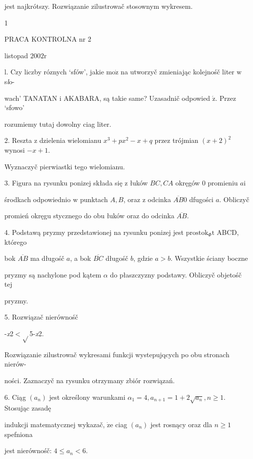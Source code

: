 \documentclass[a4paper,12pt]{article}
\begin{document}
jest najkrótszy. Rozwiązanie zilustrowač stosownym wykresem.

1




PRACA KONTROLNA nr 2

listopad $2002\mathrm{r}$

l. Czy liczby róznych `sfów', jakie $\mathrm{m}\mathrm{o}\dot{\mathrm{z}}$ na utworzyč zmieniając kolejnośč liter $\mathrm{w}$ s{\it l}o-

wach' TANATAN $\mathrm{i}$ AKABARA, są takie same? Uzasadnič odpowied $\acute{\mathrm{z}}$. Przez `sfowo'

rozumiemy tutaj dowolny ciag liter.

2. Reszta $\mathrm{z}$ dzielenia wielomianu $x^{3}+px^{2}-x+q$ przez trójmian $(x+2)^{2}$ wynosi $-x+1.$

Wyznaczyč pierwiastki tego wielomianu.

3. Figura na rysunku ponizej składa się $\mathrm{z}$ łuków $BC, CA$ okręgów $0$ promieniu $a\mathrm{i}$

środkach odpowiednio $\mathrm{w}$ punktach $A, B$, oraz $\mathrm{z}$ odcinka $\overline{AB}0$ dfugości $a$. Obliczyč

promień okręgu stycznego do obu łuków oraz do odcinka $\overline{AB}.$

4. Podstawą pryzmy przedstawionej na rysunku ponizej jest $\mathrm{p}\mathrm{r}\mathrm{o}\mathrm{s}\mathrm{t}\mathrm{o}\mathrm{k}_{\Phi}\mathrm{t}$ ABCD, którego

bok $\overline{AB}$ ma długośč $a$, a bok $\overline{BC}$ długośč $b$, gdzie $a>b$. Wszystkie ściany boczne

pryzmy są nachylone pod kątem $\alpha$ do płaszczyzny podstawy. Obliczyč objetośč tej

pryzmy.

5. Rozwiązač nierównośč

-{\it x}2$<\sqrt{}$5-{\it x}2.

Rozwiązanie zilustrowač wykresami funkcji wystepujqcych po obu stronach nierów-

ności. Zaznaczyč na rysunku otrzymany zbiór rozwiązań.

6. Ciąg $(a_{n})$ jest określony warunkami $\alpha_{1}=4, a_{n+1}=1+2\sqrt{a_{n}}, n\geq 1$. Stosując zasadę

indukcji matematycznej wykazač, $\dot{\mathrm{z}}\mathrm{e}$ ciag $(a_{n})$ jest rosnący oraz dla $n\geq 1$ spefniona

jest nierównośč: $4\leq a_{n}<6.$
\end{document}
